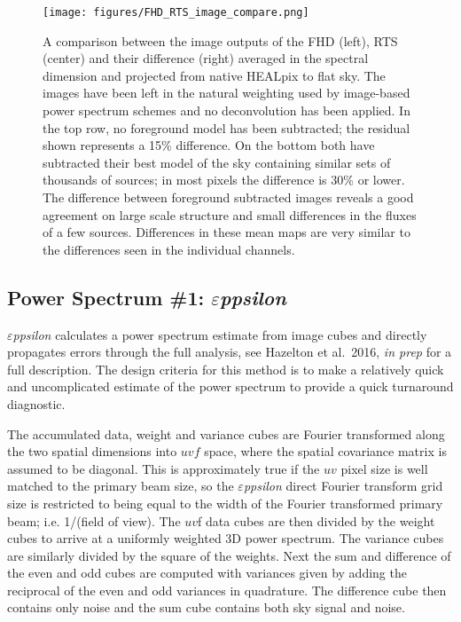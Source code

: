 \documentclass[twolcolumn,iop]{emulateapj}
\def\eppsilon{{\it $\varepsilon$ppsilon}}
\def\eppsiloncite{Hazelton et al.\ 2016, \emph{in prep}}
\begin{document}
\begin{figure}[htb]
\begin{center}
\texttt{[image: figures/FHD\_RTS\_image\_compare.png]}
\caption{A comparison between the image outputs of the FHD (left), RTS (center) and their difference (right) averaged in the spectral dimension and projected from native HEALpix to flat sky. The images have been left in the natural weighting used by image-based power spectrum schemes and no deconvolution has been applied.   In the top row, no foreground model has been subtracted; the residual shown represents a 15\% difference. On the bottom both have subtracted their best model of the sky containing similar sets of thousands of sources; in most pixels the difference is 30\% or lower.   The difference between foreground subtracted images reveals a good agreement on large scale structure and small differences in the fluxes of a few sources. Differences in these mean maps are very similar to the differences seen in the individual channels.
\label{fig:image_compare}}
\end{center}
\end{figure}


\subsection{Power Spectrum \#1: \eppsilon}
\label{sec:EPPSILON}
\eppsilon{} calculates a power spectrum estimate from image cubes and
directly propagates errors through the full analysis, see \eppsiloncite{} for a full description. The design criteria for this method is to make a relatively quick and uncomplicated estimate of the power spectrum to provide a quick turnaround diagnostic. 


The accumulated data, weight and variance cubes are Fourier transformed along the two spatial dimensions into $uvf$ space, where the spatial covariance matrix is assumed to be diagonal. This is approximately true if the $uv$ pixel size is well matched to the primary beam size, so the  \eppsilon{} direct Fourier transform grid size is restricted to being equal to the width of the Fourier transformed primary beam; i.e. 1/(field of view). The $uv$f data cubes are then divided by the weight cubes to arrive at a uniformly weighted 3D power spectrum. The variance cubes are similarly divided by the square of the weights. Next the sum and difference of the even and odd cubes are computed with variances given by adding the reciprocal of the even and odd variances in quadrature. The difference cube then contains only noise  and the sum cube contains both sky signal and noise.
\end{document}
